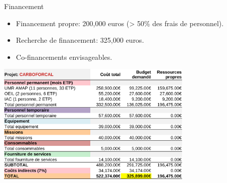 \documentclass[10pt,table,dvipsnames,compress]{beamer}
\begin{document}
\begin{frame}[label={sec:orgfa8c2e7}]{Financement}
\begin{itemize}
\item Financement propre: 200,000 euros (> 50\% des frais de personnel).
\item Recherche de financement: 325,000 euros.
\item Co-financements envisageables.
\end{itemize}

\begin{center}
\includegraphics[width=0.7\textwidth]{tabs/budget_Projet.png}
\end{center}
\end{frame}


\end{document}

